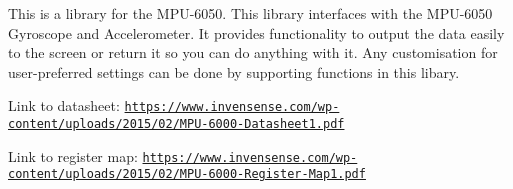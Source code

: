 This is a library for the M\+P\+U-\/6050. This library interfaces with the M\+P\+U-\/6050 Gyroscope and Accelerometer. It provides functionality to output the data easily to the screen or return it so you can do anything with it. Any customisation for user-\/preferred settings can be done by supporting functions in this libary.

Link to datasheet\+: \href{https://www.invensense.com/wp-content/uploads/2015/02/MPU-6000-Datasheet1.pdf}{\tt https\+://www.\+invensense.\+com/wp-\/content/uploads/2015/02/\+M\+P\+U-\/6000-\/\+Datasheet1.\+pdf}

Link to register map\+: \href{https://www.invensense.com/wp-content/uploads/2015/02/MPU-6000-Register-Map1.pdf}{\tt https\+://www.\+invensense.\+com/wp-\/content/uploads/2015/02/\+M\+P\+U-\/6000-\/\+Register-\/\+Map1.\+pdf} 